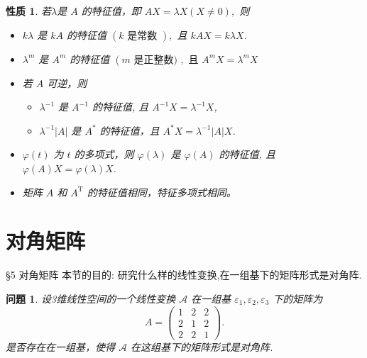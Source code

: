 \documentclass[13pt]{beamer}
\newtheorem*{prop}{性质}
\newtheorem*{qst}{问题}
\def\A{\mathscr{A}}
\begin{document}
\begin{frame}
\begin{prop}
若$\lambda$是 $A$ 的特征值，即 $A X=\lambda X( X \neq 0),$ 则
\begin{itemize}
	\item  $k \lambda$ 是 ${k} {A}$ 的特征值 $({k} \text { 是常数 }),$ 且 ${k} A {X}={k} \lambda {X}$.
	\item $\lambda^{m}$ 是 $A^{m}$ 的特征值 $\left(m \text { 是正整数) }, \text { 且 } A^{m} X=\lambda^{m} X\right.$
	\item 若 $A$ 可逆，则 
\begin{itemize}
	\item $\lambda^{-1}$ 是 $A^{-1}$ 的特征值, 且 $A^{-1} X=\lambda^{-1} X$, 
	\item $\lambda^{-1}|A|$ 是 $A^{*}$ 的特征值，且 $A^{*} X=\lambda^{-1}|A| X$.
\end{itemize}
	\item $\varphi(t)$ 为 $t$ 的多项式，则 $\varphi(\lambda)$ 是 $\varphi(A)$ 的特征值, 且 $\varphi(A) X=\varphi(\lambda) X$.
	\item 矩阵 $A$ 和 $A^{\mathrm{T}}$ 的特征值相同，特征多项式相同。	
\end{itemize}
\end{prop}
\end{frame}


\section{对角矩阵}
\begin{frame}{\S 5 对角矩阵}
本节的目的: 研究什么样的线性变换,在一组基下的矩阵形式是对角阵. 
\begin{qst}
设3维线性空间的一个线性变换 $\A$ 在一组基 $\varepsilon_{1}, \varepsilon_{2}, \varepsilon_{3}$ 下的矩阵为 $$A=\left(\begin{array}{ccc}1 & 2 & 2 \\ 2 & 1 & 2 \\ 2 & 2 & 1\end{array}\right).$$
是否存在在一组基，使得 $\A$ 在这组基下的矩阵形式是对角阵. 
\end{qst}



\end{frame}
\end{document}
